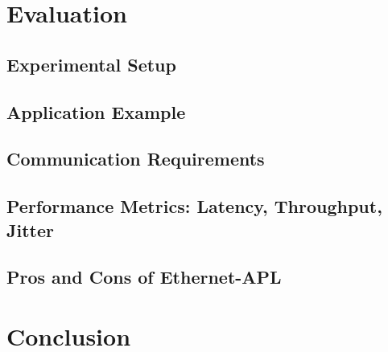 \documentclass[conference]{IEEEtran}
\begin{document}
\section{Evaluation}\label{sec:evaluation}

\subsection{Experimental Setup}

\subsection{Application Example}

\subsection{Communication Requirements}

\subsection{Performance Metrics: Latency, Throughput, Jitter}

\subsection{Pros and Cons of Ethernet-APL}

\section{Conclusion}\label{sec:conclusion}



\end{document}
